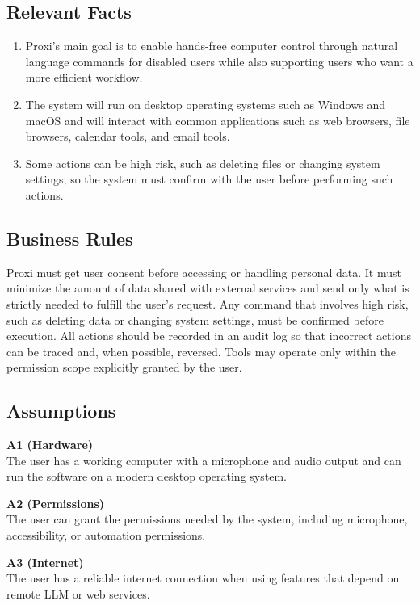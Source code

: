 \documentclass[12pt]{article}
\begin{document}
\subsection{Relevant Facts}
\begin{enumerate}
  \item Proxi's main goal is to enable hands-free computer control
  through natural language commands for disabled users while also
  supporting users who want a more efficient workflow.
  \item The system will run on desktop operating systems such as
  Windows and macOS and will interact with common applications such as
  web browsers, file browsers, calendar tools, and email tools.
  \item Some actions can be high risk, such as deleting files or
  changing system settings, so the system must confirm with the user
  before performing such actions.
\end{enumerate}

\subsection{Business Rules}
Proxi must get user consent before accessing or handling personal data.
It must minimize the amount of data shared with external services and
send only what is strictly needed to fulfill the user's request. Any
command that involves high risk, such as deleting data or changing
system settings, must be confirmed before execution. All actions
should be recorded in an audit log so that incorrect actions can be
traced and, when possible, reversed. Tools may operate only within the
permission scope explicitly granted by the user.

\subsection{Assumptions}

\noindent\textbf{A1 (Hardware)} \\
The user has a working computer with a microphone and audio output and
can run the software on a modern desktop operating system.

\noindent\textbf{A2 (Permissions)} \\
The user can grant the permissions needed by the system, including
microphone, accessibility, or automation permissions.

\noindent\textbf{A3 (Internet)} \\
The user has a reliable internet connection when using features that
depend on remote LLM or web services.
\end{document}
